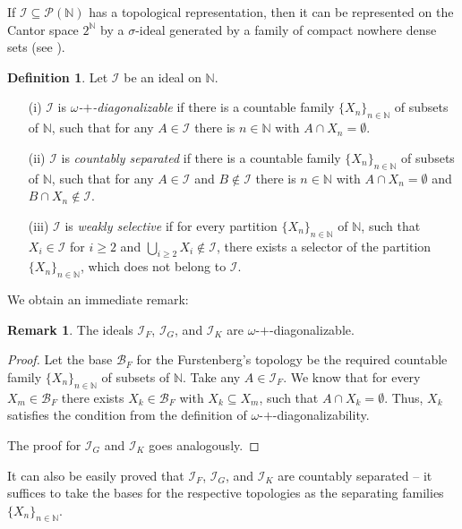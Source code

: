 \documentclass{amsart}
\theoremstyle{definition}
\newtheorem{df}[thm]{Definition}
\newtheorem{remark}[thm]{Remark}
\newcommand{\N}{{\mathbb N}}
\newcommand{\I}{\mathcal I}
\newcommand{\B}{\mathcal{B}}
\begin{document}
If $\mathcal{I}\subseteq\mathcal{P}(\N)$ has a topological representation, then it can be represented on the Cantor space $2^\N$ by a $\sigma$-ideal generated by a family of compact nowhere dense sets (see \cite[Corollary 1.3]{Adas}). 

\begin{df} Let $\mathcal{I}$ be an ideal on $\N$.
\begin{enumerate}
\item[(i)] $\mathcal{I}$ is \emph{$\omega$-$+$-diagonalizable} if there is a countable family $\{X_n\}_{n\in\N}$ of subsets of $\N$, such that for any $A\in \mathcal{I}$ there is $n\in\N$ with $A\cap X_n=\emptyset$.
\item[(ii)] $\mathcal{I}$ is \emph{countably separated} if there is a countable family $\{X_n\}_{n\in\N}$ of subsets of $\N$, such that for any $A\in \mathcal{I}$ and $B\notin \mathcal{I}$ there is $n\in\N$ with $A\cap X_n=\emptyset$ and $B\cap X_n\notin \mathcal{I}$. %
\item[(iii)] $\mathcal{I}$ is \emph{weakly selective} if for every partition $\{X_n\}_{n\in\N}$ of $\N$, such that $X_i\in\I$ for $i\geq 2$ and $\bigcup_{i\geq 2}{X_i} \notin\I$, there exists a selector of the partition $\{X_n\}_{n\in\N}$, which does not belong to $\I$.
\end{enumerate}
\end{df}

We obtain an immediate remark:

\begin{remark}
The ideals $\I_F$, $\I_G$, and $\I_K$ are $\omega$-$+$-diagonalizable.
\end{remark}

\begin{proof}
Let the base $\B_F$ for the Furstenberg's topology be the required countable family $\{X_n\}_{n\in\N}$ of subsets of $\N$. Take any $A\in \I_F$. We know that for every $X_m \in \B_F$ there exists $X_k \in \B_F$ with $X_k \subseteq X_m$, such that $A\cap X_k = \emptyset$. Thus, $X_k$ satisfies the condition from the definition of $\omega$-$+$-diagonalizability.

The proof for $\I_G$ and $\I_K$ goes analogously.
\end{proof}

It can also be easily proved that $\I_F$, $\I_G$, and $\I_K$ are countably separated -- it suffices to take the bases for the respective topologies as the separating families $\{X_n\}_{n\in\N}$.
\end{document}
